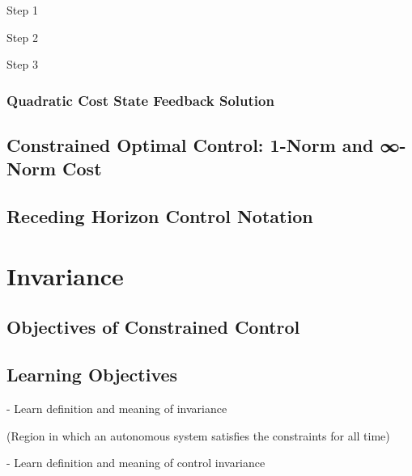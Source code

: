 Step 1

Step 2

Step 3


\subsubsection{Quadratic Cost State Feedback Solution}



\subsection{Constrained Optimal Control: 1-Norm and ∞-Norm Cost}






\subsection{Receding Horizon Control Notation}



\section{Invariance}




\subsection{Objectives of Constrained Control}



\subsection{Learning Objectives}

- Learn definition and meaning of invariance

(Region in which an autonomous system satisfies the constraints for all time)

- Learn definition and meaning of control invariance

